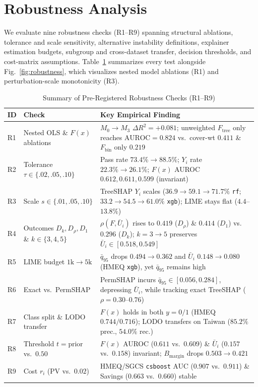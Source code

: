 \documentclass[conference]{IEEEtran}
\begin{document}
\section{Robustness Analysis}
\label{sec:robustness}
We evaluate nine robustness checks (R1--R9) spanning structural ablations, tolerance and scale sensitivity, alternative instability definitions, explainer estimation budgets, subgroup and cross-dataset transfer, decision thresholds, and cost-matrix assumptions. Table~\ref{tab:robustness} summarizes every test alongside Fig.~\ref{fig:robustness}, which visualizes nested model ablations (R1) and perturbation-scale monotonicity (R3).

\begin{table}[!t]
\centering
\caption{Summary of Pre-Registered Robustness Checks (R1--R9)}
\label{tab:robustness}
\scriptsize
\renewcommand{\arraystretch}{0.77}
\setlength{\tabcolsep}{2.4pt}
\begin{tabular}{@{}p{0.45cm}p{2.35cm}p{5.1cm}@{}}
\toprule
\textbf{ID} & \textbf{Check} & \textbf{Key Empirical Finding} \\
\midrule
R1 & Nested OLS \& $F(x)$ ablations & $M_0{\to}M_3$ $\Delta R^2{=}{+}0.081$; unweighted $F_{\mathrm{tree}}$ only reaches $\mathrm{AUROC}{=}0.824$ vs.\ cover-wt $0.411$ \& $F_{\mathrm{bin}}$ only $0.219$ \\
R2 & Tolerance $\tau{\in}\{.02,.05,.10\}$ & Pass rate $73.4\%{\to}88.5\%$; $Y_i$ rate $22.3\%{\to}26.1\%$; $F(x)$ AUROC $0.612, 0.611, 0.599$ (invariant) \\
R3 & Scale $s{\in}\{.01,.05,.10\}$ & TreeSHAP $Y_i$ scales ($36.9{\to}59.1{\to}71.7\%$ \texttt{rf}; $33.2{\to}54.5{\to}61.0\%$ \texttt{xgb}); LIME stays flat ($4.4$--$13.8\%$) \\
R4 & Outcomes $D_k, D_\rho, D_1$ \& $k{\in}\{3,4,5\}$ & $\rho(F,\bar{U}_i)$ rises to $0.419$ ($D_\rho$) \& $0.414$ ($D_1$) vs.\ $0.296$ ($D_k$); $k{=}3{\to}5$ preserves $\bar{U}_i \in [0.518,0.549]$ \\
R5 & LIME budget $1\text{k}{\to}5\text{k}$ & $\bar{q}_{95}$ drops $0.494{\to}0.362$ and $\bar{U}_i$ $0.148{\to}0.080$ (HMEQ \texttt{xgb}), yet $\bar{q}_{95}$ remains high \\
R6 & Exact vs.\ PermSHAP & PermSHAP incurs $\bar{q}_{95}\in[0.056,0.284]$, depressing $\bar{U}_i$, while tracking exact TreeSHAP ($\rho{=}0.30$--$0.76$) \\
R7 & Class split \& LODO transfer & $F(x)$ holds in both $y{=}0/1$ (HMEQ $0.744/0.716$); LODO transfers on Taiwan ($85.2\%$ prec., $54.0\%$ rec.) \\
R8 & Threshold $t{=}\text{prior}$ vs.\ $0.50$ & $F(x)$ AUROC ($0.611$ vs.\ $0.609$) \& $\bar{U}_i$ ($0.157$ vs.\ $0.158$) invariant; $B_{\mathrm{margin}}$ drops $0.503{\to}0.421$ \\
R9 & Cost $r_i$ (PV vs.\ $0.02$) & HMEQ/SGCS \texttt{csboost} AUC ($0.907$ vs.\ $0.911$) \& Savings ($0.663$ vs.\ $0.660$) stable \\
\bottomrule
\end{tabular}
\end{table}
\end{document}

